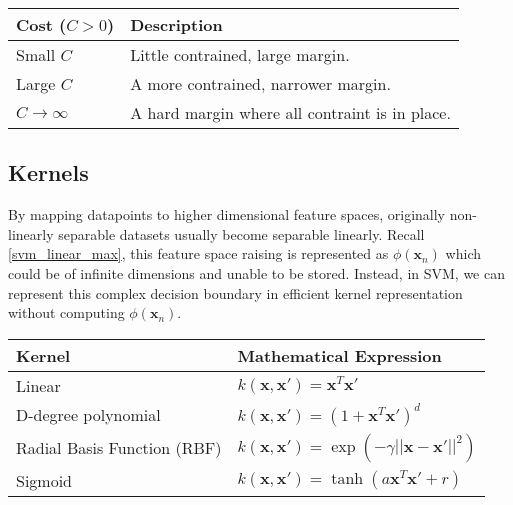 \parbox{\linewidth} {
	\centering
  \begin{tabularx}{\textwidth}{|l|X|}
    \hline
    \textbf{Cost ($C > 0 $)}	  & \textbf{Description}
    \\ \hline
    Small $C$ 							    & Little contrained, large margin. 
    \\ \hline
    Large $C$  	                & A more contrained, narrower margin.
		\\ \hline
    $C \rightarrow \infty$      & A hard margin where all contraint is in place.
    \\ \hline

  \end{tabularx}
	\label{tab:c_vals}
}


\subsection{Kernels}
By mapping datapoints to higher dimensional feature spaces, originally non-linearly separable datasets usually become separable linearly. Recall \autoref{svm_linear_max}, this feature space raising is represented as $\phi \left (\mathbf{x}_n \right)$ which could be of infinite dimensions and unable to be stored. Instead, in SVM, we can represent this complex decision boundary in efficient kernel representation without computing $\phi \left (\mathbf{x}_n \right)$. 

\parbox{\linewidth} {
  \centering
  \def\arraystretch{1.5}
  \begin{tabularx}{\textwidth}{|X|X|}
    \hline
    \textbf{Kernel}     & \textbf{Mathematical Expression}
    \\ \hline
    Linear              & $k(\mathbf{x},\mathbf{x'}) = \mathbf{x}^T\mathbf{x'}$
    \\ \hline
    D-degree polynomial & $k(\mathbf{x},\mathbf{x'}) = \left(1+\mathbf{x}^T\mathbf{x'}\right)^d$ 
    \\ \hline
    Radial Basis Function (RBF) & $k(\mathbf{x},\mathbf{x'}) = \exp \left( -\gamma ||\mathbf{x}-\mathbf{x'}||^2 \right)$
		\\ \hline
    Sigmoid             & $k(\mathbf{x},\mathbf{x'}) = \tanh \left(a\mathbf{x}^T\mathbf{x'} + r\right)$
    \\ \hline
  \end{tabularx} 
  \label{tab:kernel_vals}
}

